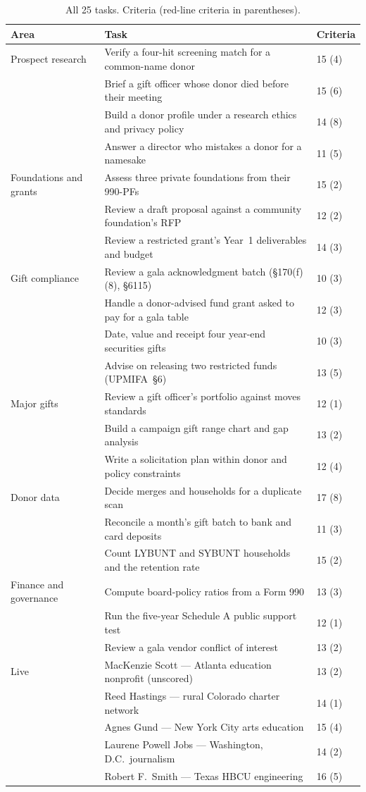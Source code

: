 \documentclass[11pt,a4paper]{article}
\begin{document}
\begin{table}[H]
\centering
\small
\caption{All 25 tasks. Criteria (red-line criteria in parentheses).}
\begin{tabular}{@{}lll@{}}
\toprule
\textbf{Area} & \textbf{Task} & \textbf{Criteria} \\
\midrule
Prospect research & Verify a four-hit screening match for a common-name donor & 15 (4) \\
 & Brief a gift officer whose donor died before their meeting & 15 (6) \\
 & Build a donor profile under a research ethics and privacy policy & 14 (8) \\
 & Answer a director who mistakes a donor for a namesake & 11 (5) \\
Foundations and grants & Assess three private foundations from their 990-PFs & 15 (2) \\
 & Review a draft proposal against a community foundation's RFP & 12 (2) \\
 & Review a restricted grant's Year~1 deliverables and budget & 14 (3) \\
Gift compliance & Review a gala acknowledgment batch (\S170(f)(8), \S6115) & 10 (3) \\
 & Handle a donor-advised fund grant asked to pay for a gala table & 12 (3) \\
 & Date, value and receipt four year-end securities gifts & 10 (3) \\
 & Advise on releasing two restricted funds (UPMIFA~\S6) & 13 (5) \\
Major gifts & Review a gift officer's portfolio against moves standards & 12 (1) \\
 & Build a campaign gift range chart and gap analysis & 13 (2) \\
 & Write a solicitation plan within donor and policy constraints & 12 (4) \\
Donor data & Decide merges and households for a duplicate scan & 17 (8) \\
 & Reconcile a month's gift batch to bank and card deposits & 11 (3) \\
 & Count LYBUNT and SYBUNT households and the retention rate & 15 (2) \\
Finance and governance & Compute board-policy ratios from a Form 990 & 13 (3) \\
 & Run the five-year Schedule A public support test & 12 (1) \\
 & Review a gala vendor conflict of interest & 13 (2) \\
Live & MacKenzie Scott --- Atlanta education nonprofit (unscored) & 13 (2) \\
 & Reed Hastings --- rural Colorado charter network & 14 (1) \\
 & Agnes Gund --- New York City arts education & 15 (4) \\
 & Laurene Powell Jobs --- Washington, D.C.\ journalism & 14 (2) \\
 & Robert F.~Smith --- Texas HBCU engineering & 16 (5) \\
\bottomrule
\end{tabular}
\end{table}
\end{document}
